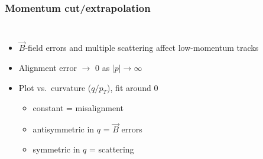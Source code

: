 \documentclass[compress]{beamer}
\begin{document}
\begin{frame}
\frametitle{Momentum cut/extrapolation}

\begin{columns}
\begin{itemize}
\item $\vec{B}$-field errors and multiple scattering affect low-momentum tracks
\item Alignment error $\to$ 0 as $|p| \to \infty$
\item Plot vs.\ curvature ($q/p_T$), fit around 0

\vspace{-0.2 cm}
\begin{itemize}
\item constant = misalignment
\item antisymmetric in $q$ = $\vec{B}$ errors
\item symmetric in $q$ = scattering
\end{itemize}
\end{itemize}


\end{columns}
\end{frame}
\end{document}
